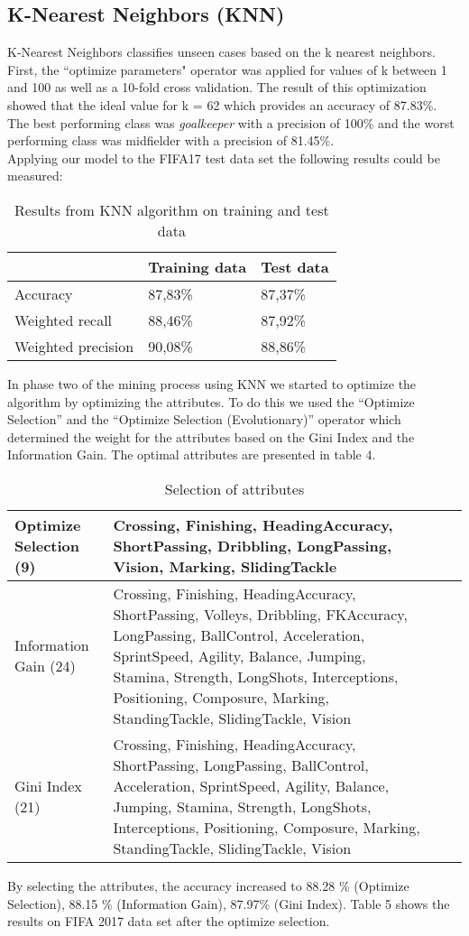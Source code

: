 
\subsection{K-Nearest Neighbors (KNN)}
\label{sec:KNN}
K-Nearest Neighbors classifies unseen cases based on the k nearest neighbors. 
First, the ``optimize parameters" operator was applied for values of k between 1 and 100 as well as a 10-fold cross validation. The result of this optimization showed that the ideal value for k = 62 which provides an accuracy of 87.83\%. The best performing class was \textit{goalkeeper} with a precision of 100\% and the worst performing class was midfielder with a precision of 81.45\%. \\
Applying our model to the FIFA17 test data set the following results could be measured:\\
\begin{table}[H]
\label{Tab:knn}
\centering
\begin{tabular}{@{}lll@{}}
\toprule
                   & Training data & Test data \\ \midrule
Accuracy           & 87,83\%       & 87,37\%   \\
Weighted recall    & 88,46\%       & 87,92\%   \\
Weighted precision & 90,08\%       & 88,86\%   \\ \bottomrule
\end{tabular}
\caption{Results from KNN algorithm on training and test data}
\end{table}
In phase two of the mining process using KNN we started to optimize the algorithm by optimizing the attributes.
To do this we used the ``Optimize Selection'' and the ``Optimize Selection (Evolutionary)'' operator which determined the weight for the attributes based on the Gini Index and the Information Gain.
The optimal attributes are presented in table 4.
\begin{table}[H]
\begin{tabular}{p{3.5cm}|p{7.5cm}l|l}
\hline 
Optimize Selection (9) & Crossing, Finishing, HeadingAccuracy, ShortPassing, Dribbling, LongPassing, Vision, Marking, SlidingTackle\\
\hline
Information Gain (24)& Crossing, Finishing, HeadingAccuracy, ShortPassing, Volleys, Dribbling, FKAccuracy, LongPassing, BallControl, Acceleration, SprintSpeed, Agility, Balance, Jumping, Stamina, Strength, LongShots, Interceptions, Positioning, Composure, Marking, StandingTackle, SlidingTackle, Vision \\
\hline 
Gini Index (21) & Crossing, Finishing, HeadingAccuracy, ShortPassing, LongPassing, BallControl, Acceleration, SprintSpeed, Agility, Balance, Jumping, Stamina, Strength, LongShots, Interceptions, Positioning, Composure, Marking, StandingTackle, SlidingTackle, Vision\\ \hline
\end{tabular}
\label{Tab:knn2}
\caption{Selection of attributes}
\end{table}	
By selecting the attributes, the accuracy increased to 88.28 \% (Optimize Selection), 88.15 \% (Information Gain), 87.97\% (Gini Index). Table 5 shows the results on FIFA 2017 data set after the optimize selection.

